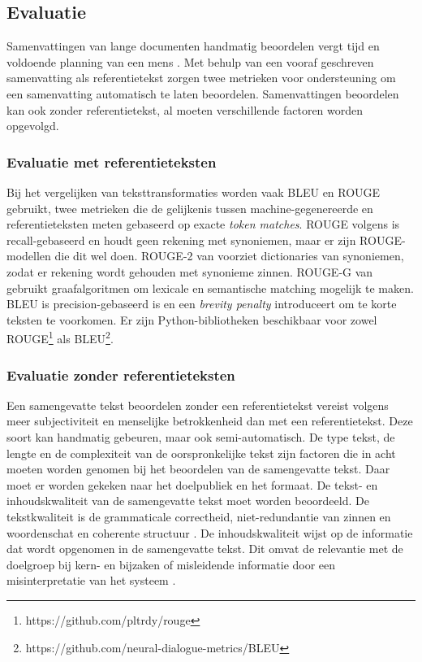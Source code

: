 \subsection{Evaluatie}

Samenvattingen van lange documenten handmatig beoordelen vergt tijd en voldoende planning van een mens \autocite{Nenkova2004}. Met behulp van een vooraf geschreven samenvatting als referentietekst zorgen twee metrieken voor ondersteuning om een samenvatting automatisch te laten beoordelen. Samenvattingen beoordelen kan ook zonder referentietekst, al moeten verschillende factoren worden opgevolgd.

\subsubsection{Evaluatie met referentieteksten}

Bij het vergelijken van teksttransformaties worden vaak BLEU en ROUGE gebruikt, twee metrieken die de gelijkenis tussen machine-gegenereerde en referentieteksten meten gebaseerd op exacte \textit{token matches}. ROUGE volgens \textcite{Lin2004} is recall-gebaseerd en houdt geen rekening met synoniemen, maar er zijn ROUGE-modellen die dit wel doen. ROUGE-2 van \textcite{Ganesan2018} voorziet dictionaries van synoniemen, zodat er rekening wordt gehouden met synonieme zinnen. ROUGE-G van \textcite{ShafieiBavani2018} gebruikt graafalgoritmen om lexicale en semantische matching mogelijk te maken. BLEU is precision-gebaseerd is en een \textit{brevity penalty} introduceert om te korte teksten te voorkomen. Er zijn Python-bibliotheken beschikbaar voor zowel ROUGE\footnote{https://github.com/pltrdy/rouge} als BLEU\footnote{https://github.com/neural-dialogue-metrics/BLEU}.

\subsubsection{Evaluatie zonder referentieteksten}

Een samengevatte tekst beoordelen zonder een referentietekst vereist volgens \textcite{Steinberger2009} meer subjectiviteit en menselijke betrokkenheid dan met een referentietekst. Deze soort kan handmatig gebeuren, maar ook semi-automatisch. De type tekst, de lengte en de complexiteit van de oorspronkelijke tekst zijn factoren die in acht moeten worden genomen bij het beoordelen van de samengevatte tekst. Daar moet er worden gekeken naar het doelpubliek en het formaat. De tekst- en inhoudskwaliteit van de samengevatte tekst moet worden beoordeeld. De tekstkwaliteit is de grammaticale correctheid, niet-redundantie van zinnen en woordenschat en coherente structuur \autocite{McCombes2022}. De inhoudskwaliteit wijst op de informatie dat wordt opgenomen in de samengevatte tekst. Dit omvat de relevantie met de doelgroep bij kern- en bijzaken of misleidende informatie door een misinterpretatie van het systeem \autocite{McCombes2022}.


